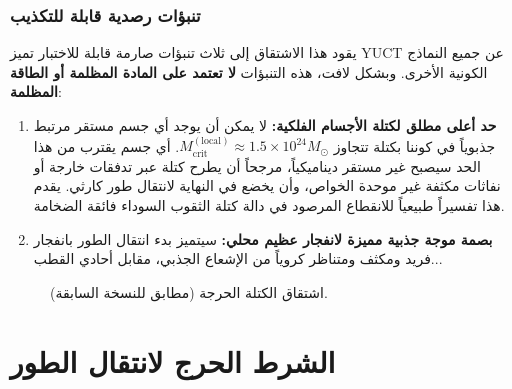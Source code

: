 \documentclass[12pt,a4paper]{article}
\begin{document}
	\subsubsection{تنبؤات رصدية قابلة للتكذيب}
	
	يقود هذا الاشتقاق إلى ثلاث تنبؤات صارمة قابلة للاختبار تميز YUCT عن جميع النماذج الكونية الأخرى. وبشكل لافت، هذه التنبؤات \textbf{لا تعتمد على المادة المظلمة أو الطاقة المظلمة}:
	
	\begin{enumerate}
		\item \textbf{حد أعلى مطلق لكتلة الأجسام الفلكية:} لا يمكن أن يوجد أي جسم مستقر مرتبط جذبوياً في كوننا بكتلة تتجاوز \(M_{\mathrm{crit}}^{\mathrm{(local)}} \approx 1.5 \times 10^{24} M_{\odot}\). أي جسم يقترب من هذا الحد سيصبح غير مستقر ديناميكياً، مرجحاً أن يطرح كتلة عبر تدفقات خارجة أو نفاثات مكثفة غير موحدة الخواص، وأن يخضع في النهاية لانتقال طور كارثي. يقدم هذا تفسيراً طبيعياً للانقطاع المرصود في دالة كتلة الثقوب السوداء فائقة الضخامة.
		
		\item \textbf{بصمة موجة جذبية مميزة لانفجار عظيم محلي:} سيتميز بدء انتقال الطور بانفجار فريد ومكثف ومتناظر كروياً من الإشعاع الجذبي، مقابل أحادي القطب...
	\end{enumerate}
	
	\begin{otherlanguage}{english}
		\begin{figure}[!ht]
			\centering
			\caption{اشتقاق الكتلة الحرجة (مطابق للنسخة السابقة).}
			\label{fig:critical-mass}
		\end{figure}
	\end{otherlanguage}
	
	\section{الشرط الحرج لانتقال الطور}
	\label{sec:critical-condition}
	
\end{document}

